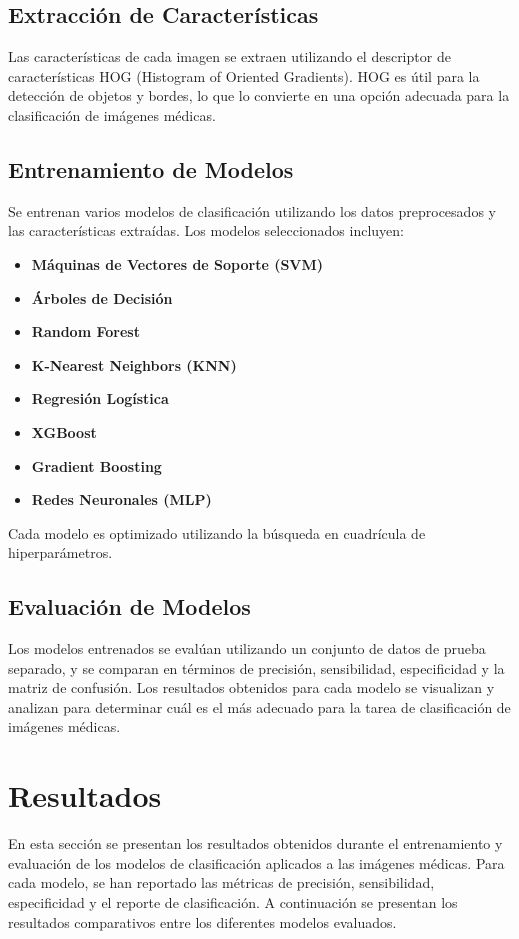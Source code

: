 \documentclass[12pt]{article}
\begin{document}
\subsection{Extracción de Características}
Las características de cada imagen se extraen utilizando el descriptor de características HOG (Histogram of Oriented Gradients). HOG es útil para la detección de objetos y bordes, lo que lo convierte en una opción adecuada para la clasificación de imágenes médicas.

\subsection{Entrenamiento de Modelos}
Se entrenan varios modelos de clasificación utilizando los datos preprocesados y las características extraídas. Los modelos seleccionados incluyen:
\begin{itemize}
    \item \textbf{Máquinas de Vectores de Soporte (SVM)}
    \item \textbf{Árboles de Decisión}
    \item \textbf{Random Forest}
    \item \textbf{K-Nearest Neighbors (KNN)}
    \item \textbf{Regresión Logística}
    \item \textbf{XGBoost}
    \item \textbf{Gradient Boosting}
    \item \textbf{Redes Neuronales (MLP)}
\end{itemize}
Cada modelo es optimizado utilizando la búsqueda en cuadrícula de hiperparámetros.

\subsection{Evaluación de Modelos}
Los modelos entrenados se evalúan utilizando un conjunto de datos de prueba separado, y se comparan en términos de precisión, sensibilidad, especificidad y la matriz de confusión. Los resultados obtenidos para cada modelo se visualizan y analizan para determinar cuál es el más adecuado para la tarea de clasificación de imágenes médicas.


\section{Resultados}
En esta sección se presentan los resultados obtenidos durante el entrenamiento y evaluación de los modelos de clasificación aplicados a las imágenes médicas. Para cada modelo, se han reportado las métricas de precisión, sensibilidad, especificidad y el reporte de clasificación. A continuación se presentan los resultados comparativos entre los diferentes modelos evaluados.
\end{document}
